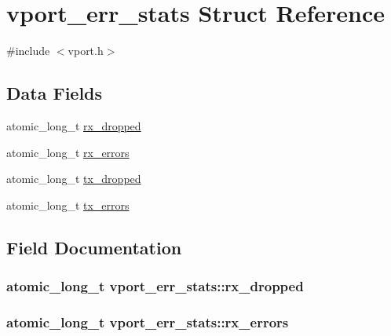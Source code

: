 \hypertarget{structvport__err__stats}{}\section{vport\+\_\+err\+\_\+stats Struct Reference}
\label{structvport__err__stats}


{\ttfamily \#include $<$vport.\+h$>$}

\subsection*{Data Fields}
\begin{DoxyCompactItemize}
\item 
atomic\+\_\+long\+\_\+t \hyperlink{structvport__err__stats_a38849ae05107fbf9e9824149b60bd91f}{rx\+\_\+dropped}
\item 
atomic\+\_\+long\+\_\+t \hyperlink{structvport__err__stats_ad253987f143edfffea6546baa0e990f6}{rx\+\_\+errors}
\item 
atomic\+\_\+long\+\_\+t \hyperlink{structvport__err__stats_a299aaacfac0fe9d48ddd000674b7816a}{tx\+\_\+dropped}
\item 
atomic\+\_\+long\+\_\+t \hyperlink{structvport__err__stats_a24478cbc4a61b5454a4247830bf2c7b4}{tx\+\_\+errors}
\end{DoxyCompactItemize}


\subsection{Field Documentation}
\hypertarget{structvport__err__stats_a38849ae05107fbf9e9824149b60bd91f}{}
\subsubsection[{rx\+\_\+dropped}]{\setlength{\rightskip}{0pt plus 5cm}atomic\+\_\+long\+\_\+t vport\+\_\+err\+\_\+stats\+::rx\+\_\+dropped}\label{structvport__err__stats_a38849ae05107fbf9e9824149b60bd91f}
\hypertarget{structvport__err__stats_ad253987f143edfffea6546baa0e990f6}{}
\subsubsection[{rx\+\_\+errors}]{\setlength{\rightskip}{0pt plus 5cm}atomic\+\_\+long\+\_\+t vport\+\_\+err\+\_\+stats\+::rx\+\_\+errors}\label{structvport__err__stats_ad253987f143edfffea6546baa0e990f6}
\hypertarget{structvport__err__stats_a299aaacfac0fe9d48ddd000674b7816a}{}

